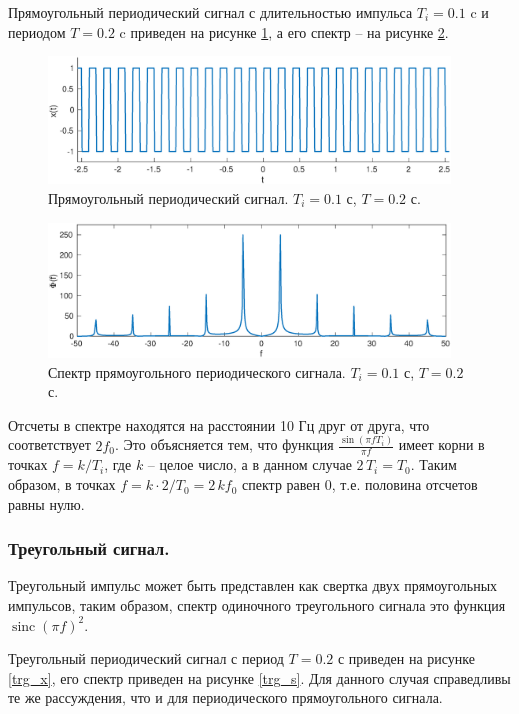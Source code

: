 \documentclass[a4paper,14pt]{extarticle}
\DeclareMathOperator{\sinc}{sinc}
\begin{document}
Прямоугольный периодический сигнал с длительностью импульса $T_i = 0.1$ c и периодом $T = 0.2$ c приведен на рисунке \ref{sqr_x}, а его спектр -- на рисунке \ref{sqr_s}. 

\begin{figure}[H]
\centering
\includegraphics[width=0.95\textwidth]{sqr_x.eps}
\captionsetup{justification=centering,margin=0cm}
\caption{Прямоугольный периодический сигнал. $T_i = 0.1$ с, $T = 0.2$ с.}
\label{sqr_x}
\end{figure}

\begin{figure}[H]
\centering
\includegraphics[width=0.95\textwidth]{sqr_s.eps}
\captionsetup{justification=centering,margin=1cm}
\caption{Спектр прямоугольного периодического сигнала. $T_i = 0.1$ с, $T = 0.2$ с. }
\label{sqr_s}
\end{figure}


Отсчеты в спектре находятся на расстоянии 10 Гц друг от друга, что соответствует $2f_0$. Это объясняется тем, что функция $\frac{\sin(\pi f T_i)}{\pi f}$ имеет корни в точках $f = k/T_i$, где $k$ -- целое число, а в данном случае $2\,T_i = T_0$. Таким образом, в точках $f = k \cdot 2/T_0 =  2 \, k f_0$ спектр равен 0, т.е. половина отсчетов равны нулю.

\subsubsection{Треугольный сигнал.}
Треугольный импульс может быть представлен как свертка двух прямоугольных импульсов, таким образом, спектр одиночного треугольного сигнала это функция $\sinc(\pi f)^2$.

Треугольный периодический сигнал с период $T = 0.2$ с приведен на рисунке \ref{trg_x}, его спектр приведен на рисунке \ref{trg_s}. Для данного случая справедливы те же рассуждения, что и для периодического прямоугольного сигнала.
\end{document}
